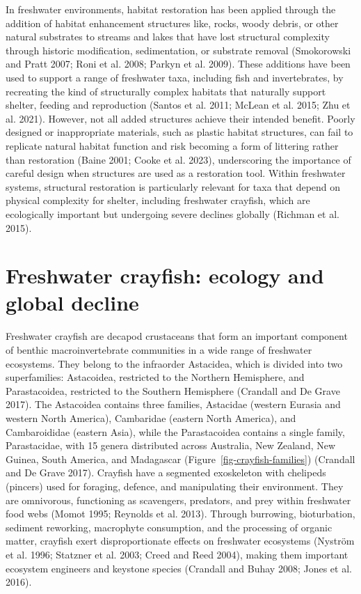 \documentclass[
  12pt,
  a4paper,
  oneside]{scrbook}
\begin{document}
In freshwater environments, habitat restoration has been applied through
the addition of habitat enhancement structures like, rocks, woody
debris, or other natural substrates to streams and lakes that have lost
structural complexity through historic modification, sedimentation, or
substrate removal (Smokorowski and Pratt 2007; Roni et al. 2008; Parkyn
et al. 2009). These additions have been used to support a range of
freshwater taxa, including fish and invertebrates, by recreating the
kind of structurally complex habitats that naturally support shelter,
feeding and reproduction (Santos et al. 2011; McLean et al. 2015; Zhu et
al. 2021). However, not all added structures achieve their intended
benefit. Poorly designed or inappropriate materials, such as plastic
habitat structures, can fail to replicate natural habitat function and
risk becoming a form of littering rather than restoration (Baine 2001;
Cooke et al. 2023), underscoring the importance of careful design when
structures are used as a restoration tool. Within freshwater systems,
structural restoration is particularly relevant for taxa that depend on
physical complexity for shelter, including freshwater crayfish, which
are ecologically important but undergoing severe declines globally
(Richman et al. 2015).

\section{Freshwater crayfish: ecology and global
decline}\label{freshwater-crayfish-ecology-and-global-decline}

Freshwater crayfish are decapod crustaceans that form an important
component of benthic macroinvertebrate communities in a wide range of
freshwater ecosystems. They belong to the infraorder Astacidea, which is
divided into two superfamilies: Astacoidea, restricted to the Northern
Hemisphere, and Parastacoidea, restricted to the Southern Hemisphere
(Crandall and De Grave 2017). The Astacoidea contains three families,
Astacidae (western Eurasia and western North America), Cambaridae
(eastern North America), and Cambaroididae (eastern Asia), while the
Parastacoidea contains a single family, Parastacidae, with 15 genera
distributed across Australia, New Zealand, New Guinea, South America,
and Madagascar (Figure~\ref{fig-crayfish-families}) (Crandall and De
Grave 2017). Crayfish have a segmented exoskeleton with chelipeds
(pincers) used for foraging, defence, and manipulating their
environment. They are omnivorous, functioning as scavengers, predators,
and prey within freshwater food webs (Momot 1995; Reynolds et al. 2013).
Through burrowing, bioturbation, sediment reworking, macrophyte
consumption, and the processing of organic matter, crayfish exert
disproportionate effects on freshwater ecosystems (Nyström et al. 1996;
Statzner et al. 2003; Creed and Reed 2004), making them important
ecosystem engineers and keystone species (Crandall and Buhay 2008; Jones
et al. 2016).
\end{document}
